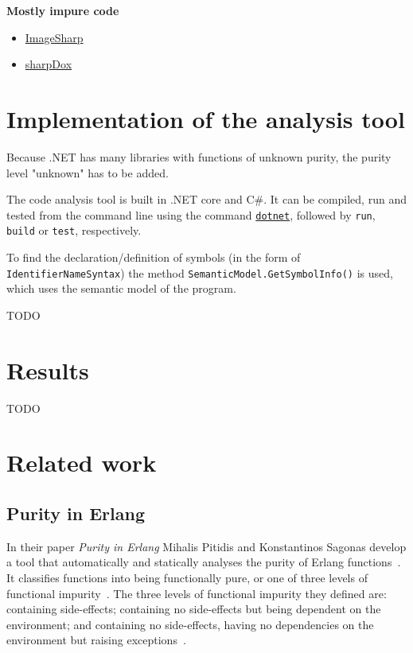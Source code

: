 \documentclass[a4paper,12pt]{article}
\begin{document}
\textbf{Mostly impure code}
\begin{itemize}
  \item \href{https://github.com/SixLabors/ImageSharp/blob/master/src/ImageSharp}{ImageSharp}
  \item \href{https://github.com/geaz/sharpDox}{sharpDox}
\end{itemize}

\section{Implementation of the analysis tool} \label{sec:Implementation of the analysis tool}


Because .NET has many libraries with functions of unknown purity, the purity level "unknown" has to be added.

The code analysis tool is built in .NET core and C\#. It can be compiled, run and tested from the command line using the command \href{https://docs.microsoft.com/en-us/dotnet/core/tools/}{\texttt{dotnet}}, followed by \texttt{run}, \texttt{build} or \texttt{test}, respectively.

To find the declaration/definition of symbols (in the form of \texttt{IdentifierNameSyn\allowbreak tax}) the method \texttt{SemanticModel.GetSym\allowbreak bolInfo()} is used, which uses the semantic model of the program.

TODO

\section{Results} \label{sec:Results}
TODO

\section{Related work} \label{sec:Related work} %

\subsection{Purity in Erlang} \label{sub:Purity-in-Erlang}
In their paper \textit{Purity in Erlang} Mihalis Pitidis and Konstantinos Sagonas develop a tool that automatically and statically analyses the purity of Erlang functions~\cite{pitidis2010purity}. It classifies functions into being functionally pure, or one of three levels of functional impurity~\cite{pitidis2010purity}.
The three levels of functional impurity they defined are: containing side-effects; containing no side-effects but being dependent on the environment; and containing no side-effects, having no dependencies on the environment but raising exceptions~\cite{pitidis2010purity}.
\end{document}
